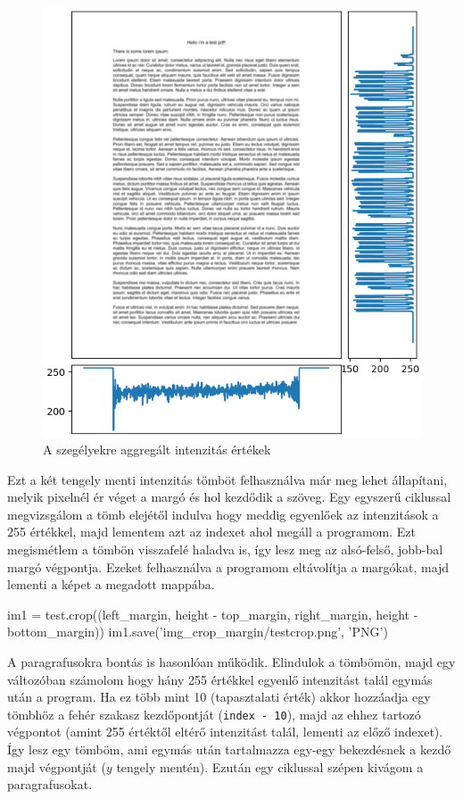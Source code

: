 \begin{figure}[h]
\centering
\includegraphics[scale=1]{images/mf_2.png}
\caption{A szegélyekre aggregált intenzitás értékek}
\label{fig:mf_2}
\end{figure}

Ezt a két tengely menti intenzitás tömböt felhasználva már meg lehet állapítani, melyik pixelnél ér véget a margó és hol kezdődik a szöveg. Egy egyszerű ciklussal megvizsgálom a tömb elejétől indulva hogy meddig egyenlőek az intenzitások a 255 értékkel, majd lementem azt az indexet ahol megáll a programom. Ezt megismétlem a tömbön visszafelé haladva is, így lesz meg az alsó-felső, jobb-bal margó végpontja. Ezeket felhasználva a programom eltávolítja a margókat, majd lementi a képet a megadott mappába.

\begin{python}
im1 = test.crop((left_margin,
                 height - top_margin,
                 right_margin,
                 height - bottom_margin))
im1.save('img_crop_margin/testcrop.png', 'PNG')
\end{python}

A paragrafusokra bontás is hasonlóan működik. Elindulok a tömbömön, majd egy változóban számolom hogy hány 255 értékkel egyenlő intenzitást talál egymás után a program. Ha ez több mint 10 (tapasztalati érték) akkor hozzáadja egy tömbhöz a fehér szakasz kezdőpontját (\texttt{index - 10}), majd az ehhez tartozó végpontot (amint 255 értéktől eltérő intenzitást talál, lementi az előző indexet). Így lesz egy tömböm, ami egymás után tartalmazza egy-egy bekezdésnek a kezdő majd végpontját ($y$ tengely mentén). Ezután egy ciklussal szépen kivágom a paragrafusokat.

